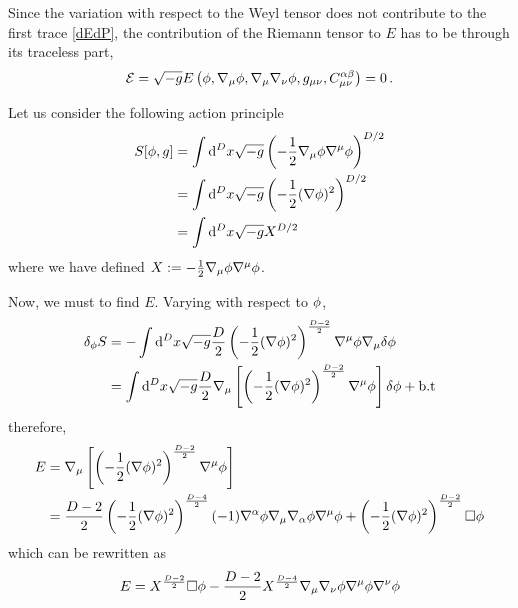 Since the variation with respect to the Weyl tensor does not contribute to the first trace \eqref{dEdP}, the contribution of the Riemann tensor to $E$ has to be through its traceless part,
\begin{equation}
	\mathcal{E} =\sqrt{-g}E\left(\phi,\nabla_\mu \phi ,\nabla_\mu \nabla_\nu \phi ,g_{\mu\nu },C_{\mu\nu }^{\alpha\beta }\right)=0\,.
\end{equation}

\begin{ej}
	Let us consider the following action principle
	\begin{align}
  S[\phi,g]&=\int\dd^Dx\sqrt{-g}\left(-\frac{1}{2}\nabla_\mu \phi\nabla^\mu \phi \right)^{D/2}\\
  &=\int\dd^Dx\sqrt{-g}\left(-\frac{1}{2}(\nabla\phi )^2\right)^{D/2}\\
  &=\int\dd^Dx\sqrt{-g}X^{D/2}
\end{align}
where we have defined $X:=-\frac{1}{2}\nabla_\mu \phi\nabla^\mu \phi$. 

Now, we must to find $E$. Varying with respect to $\phi$,
\begin{align}
  \delta_\phi S&=-\int\dd^Dx\sqrt{-g}\frac{D}{2}\left(-\frac{1}{2}(\nabla\phi )^2\right)^{\frac{D-2}{2}}\nabla^\mu\phi \nabla_\mu \delta\phi \\
  &=\int\dd^Dx\sqrt{-g}\frac{D}{2}\nabla_\mu \left[\left(-\frac{1}{2}(\nabla\phi )^2\right)^{\frac{D-2}{2}}\nabla^\mu \phi \right]\delta\phi +\rm b.t
\end{align}
therefore,
\begin{align}
  E&=\nabla_\mu \left[\left(-\frac{1}{2}(\nabla\phi )^2\right)^{\frac{D-2}{2}}\nabla^\mu \phi \right]\\
  &=\frac{D-2}{2}\left(-\frac{1}{2}(\nabla\phi )^2\right)^{\frac{D-4}{2}}(-1)\nabla^\alpha \phi \nabla_\mu \nabla_\alpha\phi \nabla^\mu \phi +\left(-\frac{1}{2}(\nabla\phi )^2\right)^{\frac{D-2}{2}}\Box\phi 
\end{align}
which can be rewritten as
\begin{equation}
  E=X^{\frac{D-2}{2}}\Box\phi -\frac{D-2}{2}X^{\frac{D-4}{2}}\nabla_\mu \nabla_\nu \phi\nabla^\mu \phi\nabla^\nu \phi 
\end{equation}


\end{ej}
